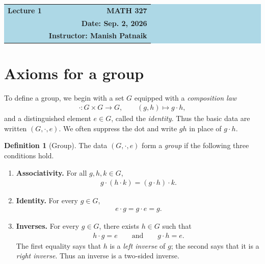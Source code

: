 \documentclass[reqno,11pt]{amsart}
\theoremstyle{definition}
\newtheorem{definition}{Definition}[section]
\theoremstyle{plain}
\theoremstyle{remark}
\numberwithin{equation}{section}
\newcommand{\be}{\begin{eqnarray}}
\newcommand{\ee}{\end{eqnarray}}
\begin{document}
\begin{center}
  \colorbox{lightblue}{%
    \begin{minipage}{0.94\textwidth}
      \vspace{0.55em}
      \begin{tabular*}{\textwidth}{@{\extracolsep{\fill}}lr}
        {\color{courseblue}\bfseries\LARGE Lecture 1} &
        {\color{courseblue}\bfseries\LARGE MATH 327}\\[0.35em]
         & \textbf{Date: Sep. 2, 2026}\\
        & \textbf{Instructor: Manish Patnaik}
      \end{tabular*}
      \vspace{0.45em}
    \end{minipage}}
\end{center}

\par

\setcounter{tocdepth}{1}
\tableofcontents

\section{Axioms for a group}

To define a group, we begin with a set $G$ equipped with a \emph{composition law}
\be
\cdot \colon G\times G\longrightarrow G,
  \qquad (g,h)\longmapsto g\cdot h,
\ee
and a distinguished element $e\in G$, called the \emph{identity}. Thus the
basic data are written $(G,\cdot,e)$. We often suppress the dot and write
$gh$ in place of $g\cdot h$.

\begin{definition}[Group]
The data $(G,\cdot,e)$ form a \emph{group} if the following three conditions
hold.

\begin{enumerate}[label=\textbf{(\arabic*)}]
  \item \textbf{Associativity.} For all $g,h,k\in G$,
  \be
  g\cdot(h\cdot k)=(g\cdot h)\cdot k.
  \ee
  \item \textbf{Identity.} For every $g\in G$,
  \be
  e\cdot g=g\cdot e=g.
  \ee
  \item \textbf{Inverses.} For every $g\in G$, there exists $h\in G$ such
  that
  \be
  h\cdot g=e
    \qquad\text{and}\qquad
    g\cdot h=e.
  \ee
    The first equality says that $h$ is a \textit{left inverse} of $g$; the second says
  that it is a \textit{right inverse}. Thus an inverse is a two-sided inverse.
\end{enumerate}
\end{definition}
\end{document}
